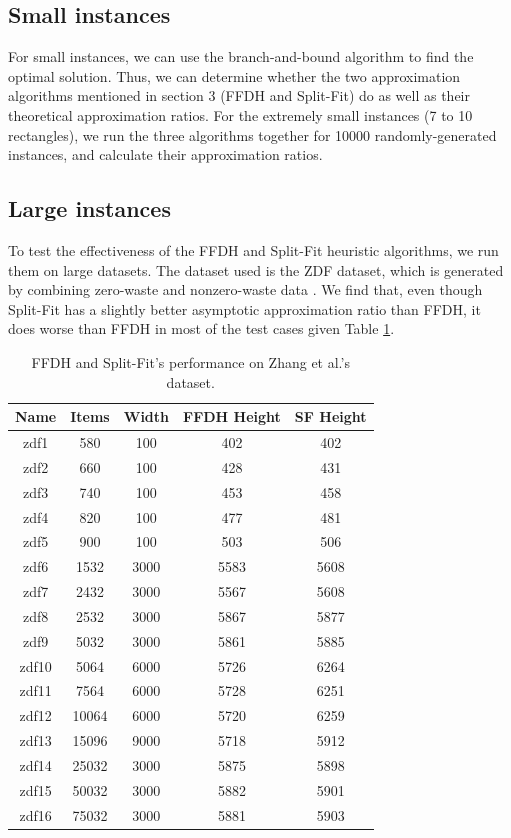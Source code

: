 \documentclass{article}
\begin{document}
\subsection{Small instances}
For small instances, we can use the branch-and-bound algorithm to find the optimal solution. Thus, we can determine whether the two approximation algorithms mentioned in section 3 (FFDH and Split-Fit) do as well as their theoretical approximation ratios. For the extremely small instances (7 to 10 rectangles), we run the three algorithms together for 10000 randomly-generated instances, and calculate their approximation ratios. 

\subsection{Large instances}
To test the effectiveness of the FFDH and Split-Fit heuristic algorithms, we run them on large datasets. The dataset used is the ZDF dataset, which is generated by combining zero-waste and nonzero-waste data \cite{zdf}. We find that, even though Split-Fit has a slightly better asymptotic approximation ratio than FFDH, it does worse than FFDH in most of the test cases given Table \ref{table:zdftest}.

\begin{table}
\centering
\begin{tabular}{|c|c|c|c|c|}
\hline Name & Items & Width & FFDH Height & SF Height \\
\hline zdf1 & 580 & 100 & 402 & 402 \\
\hline zdf2 & 660 & 100 & 428 & 431 \\
\hline zdf3 & 740 & 100 & 453 & 458 \\
\hline zdf4 & 820 & 100 & 477 & 481 \\
\hline zdf5 & 900 & 100 & 503 & 506 \\
\hline zdf6 & 1532 & 3000 & 5583 & 5608 \\
\hline zdf7 & 2432 & 3000 & 5567 & 5608 \\
\hline zdf8 & 2532 & 3000 & 5867 & 5877 \\
\hline zdf9 & 5032 & 3000 & 5861 & 5885 \\
\hline zdf10 & 5064 & 6000 & 5726 & 6264 \\
\hline zdf11 & 7564 & 6000 & 5728 & 6251 \\
\hline zdf12 & 10064 & 6000 & 5720 & 6259 \\
\hline zdf13 & 15096 & 9000 & 5718 & 5912 \\
\hline zdf14 & 25032 & 3000 & 5875 & 5898 \\
\hline zdf15 & 50032 & 3000 & 5882 & 5901 \\
\hline zdf16 & 75032 & 3000 & 5881 & 5903 \\
\hline
\end{tabular}
\caption{FFDH and Split-Fit's performance on Zhang et al.'s dataset.}
\label{table:zdftest}
\end{table}
\end{document}
